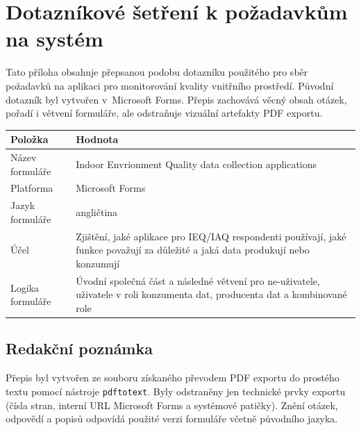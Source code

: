 \chapter{Dotazníkové šetření k požadavkům na systém}
\label{app:dotaznik}

Tato příloha obsahuje přepsanou podobu dotazníku použitého pro sběr požadavků na aplikaci pro monitorování kvality vnitřního prostředí. Původní dotazník byl vytvořen v~Microsoft Forms. Přepis zachovává věcný obsah otázek, pořadí i větvení formuláře, ale odstraňuje vizuální artefakty PDF exportu.

{
\footnotesize
\setlength{\tabcolsep}{4pt}
\renewcommand{\arraystretch}{1.15}
\begin{tabularx}{\textwidth}{@{}L{3.3cm}X@{}}
\toprule
\textbf{Položka} & \textbf{Hodnota} \\
\midrule
Název formuláře & Indoor Envrionment Quality data collection applications \\
Platforma & Microsoft Forms \\
Jazyk formuláře & angličtina \\
Účel & Zjištění, jaké aplikace pro IEQ/IAQ respondenti používají, jaké funkce považují za důležité a jaká data produkují nebo konzumují \\
Logika formuláře & Úvodní společná část a následné větvení pro ne-uživatele, uživatele v roli konzumenta dat, producenta dat a kombinované role \\
\bottomrule
\end{tabularx}
}

\section*{Redakční poznámka}
Přepis byl vytvořen ze souboru získaného převodem PDF exportu do prostého textu pomocí nástroje \texttt{pdftotext}. Byly odstraněny jen technické prvky exportu (čísla stran, interní URL Microsoft Forms a systémové patičky). Znění otázek, odpovědí a popisů odpovídá použité verzi formuláře včetně původního jazyka.

\newcommand{\question}[2]{%
  \FloatBarrier
\subsection*{#1. #2}%
}

\newcommand{\required}{\textit{Required}}

\newenvironment{choices}
  {\begin{itemize}[leftmargin=1.6em]}
  {\end{itemize}}

